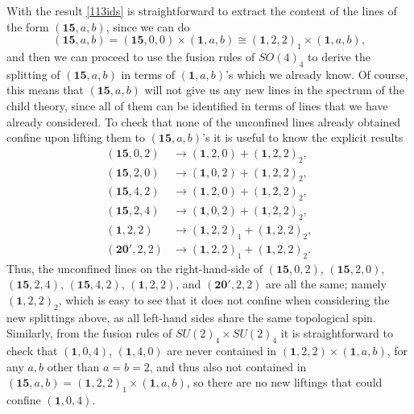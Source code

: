 \documentclass[11pt]{article}
\numberwithin{equation}{section}
\begin{document}
With the result \eqref{113ids} is straightforward to extract the content of the lines of the form $(\mathbf{15},a,b)$, since we can do
\begin{equation}
    (\mathbf{15},a,b) = (\mathbf{15},0,0) \times (\mathbf{1},a,b) \cong (\mathbf{1},2,2)_{1} \times (\mathbf{1},a,b),
\end{equation}
and then we can proceed to use the fusion rules of $SO(4)_{4}$ to derive the splitting of $(\mathbf{15},a,b)$ in terms of $(\mathbf{1},a,b)$'s which we already know. Of course, this means that $(\mathbf{15},a,b)$ will not give us any new lines in the spectrum of the child theory, since all of them can be identified in terms of lines that we have already considered. To check that none of the unconfined lines already obtained confine upon lifting them to $(\mathbf{15},a,b)$'s it is useful to know the explicit results
\begin{align}
    (\mathbf{15},0,2)& \longrightarrow (\mathbf{1},2,0) + (\mathbf{1},2,2)_{2}, \\[0.3cm]
    (\mathbf{15},2,0)& \longrightarrow (\mathbf{1},0,2) + (\mathbf{1},2,2)_{2}, \\[0.3cm]
    (\mathbf{15},4,2)& \longrightarrow (\mathbf{1},2,0) + (\mathbf{1},2,2)_{2}, \\[0.3cm]
    (\mathbf{15},2,4)& \longrightarrow (\mathbf{1},0,2) + (\mathbf{1},2,2)_{2}, \\[0.3cm]
    (\mathbf{1},2,2)&  \longrightarrow (\mathbf{1},2,2)_{1} + (\mathbf{1},2,2)_{2}, \\[0.3cm]
    (\mathbf{20}',2,2)& \longrightarrow (\mathbf{1},2,2)_{1} + (\mathbf{1},2,2)_{2}. 
\end{align}
Thus, the unconfined lines on the right-hand-side of $(\mathbf{15},0,2)$, $(\mathbf{15},2,0)$, $(\mathbf{15},2,4)$, $(\mathbf{15},4,2)$, $(\mathbf{1},2,2)$, and $(\mathbf{20}',2,2)$ are all the same; namely $(\mathbf{1},2,2)_{2}$, which is easy to see that it does not confine when considering the new splittings above, as all left-hand sides share the same topological spin. Similarly, from the fusion rules of $SU(2)_{4} \times SU(2)_{4}$ it is straightforward to check that $(\mathbf{1},0,4)$, $(\mathbf{1},4,0)$ are never contained in  $(\mathbf{1},2,2) \times (\mathbf{1},a,b)$, for any $a,b$ other than $a=b=2$, and thus also not contained in $(\mathbf{15},a,b) = (\mathbf{1},2,2)_{1} \times (\mathbf{1},a,b)$, so there are no new liftings that could confine $(\mathbf{1},0,4)$.
\end{document}
